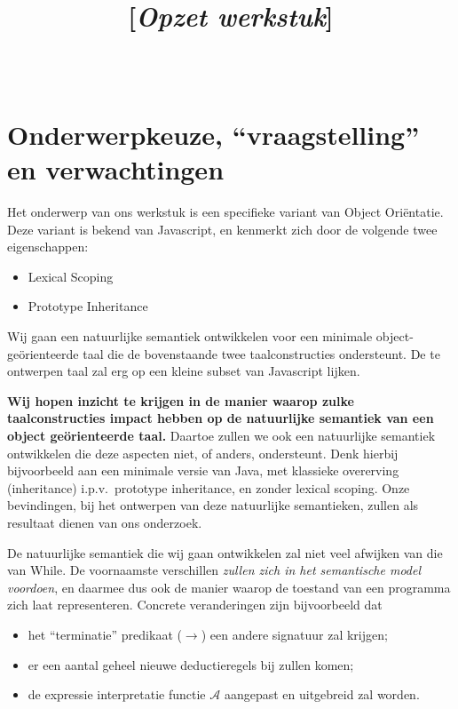 \documentclass[11pt]{article}
\title{\Title \\ {\Large [\textit{Opzet werkstuk}]}}
\author{\Tim \\ \Kelley}
\begin{document}
\maketitle
\thispagestyle{fancy}

\section*{Onderwerpkeuze, ``vraagstelling'' en verwachtingen}

Het onderwerp van ons werkstuk is een specifieke variant van Object Ori\"entatie. Deze variant is bekend van Javascript, en kenmerkt zich door de volgende twee eigenschappen:

\begin{itemize}
	\itemsep-5pt
	\item Lexical Scoping
	\item Prototype Inheritance
\end{itemize}

Wij gaan een natuurlijke semantiek ontwikkelen voor een minimale object-ge\"orienteerde taal die de bovenstaande twee taalconstructies ondersteunt. De te ontwerpen taal zal erg op een kleine subset van Javascript lijken.

\textbf{Wij hopen inzicht te krijgen in de manier waarop zulke taalconstructies impact hebben op de natuurlijke semantiek van een object ge\"orienteerde taal.} Daartoe zullen we ook een natuurlijke semantiek ontwikkelen die deze aspecten niet, of anders, ondersteunt. Denk hierbij bijvoorbeeld aan een minimale versie van Java, met klassieke overerving (inheritance) i.p.v.~prototype inheritance, en zonder lexical scoping. Onze bevindingen, bij het ontwerpen van deze natuurlijke semantieken, zullen als resultaat dienen van ons onderzoek.

De natuurlijke semantiek die wij gaan ontwikkelen zal niet veel afwijken van die van While. De voornaamste verschillen \textit{zullen zich in het semantische model voordoen}, en daarmee dus ook de manier waarop de toestand van een programma zich laat representeren. Concrete veranderingen zijn bijvoorbeeld dat

\begin{itemize}
	\itemsep-5pt
	\item het ``terminatie'' predikaat ($\longrightarrow$) een andere signatuur zal krijgen;
	\item er een aantal geheel nieuwe deductieregels bij zullen komen;
	\item de expressie interpretatie functie $\mathcal{A}$ aangepast en uitgebreid zal worden.
\end{itemize}
\end{document}
